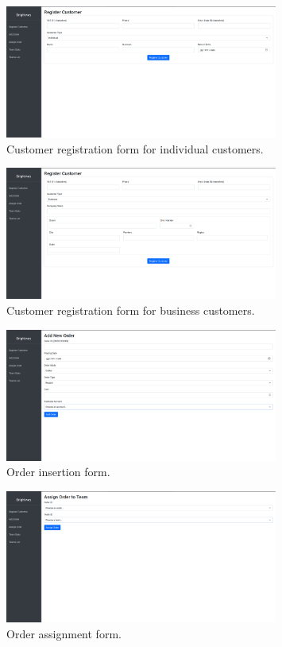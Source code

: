 \begin{figure}[H]
    \centering
    \includegraphics[width=0.8\textwidth]{img/web_app/customer_i.png}
    \caption{Customer registration form for individual customers.}
\end{figure}

\begin{figure}[H]
    \centering
    \includegraphics[width=0.8\textwidth]{img/web_app/customer_b.png}
    \caption{Customer registration form for business customers.}
\end{figure}

\begin{figure}[H]
    \centering
    \includegraphics[width=0.8\textwidth]{img/web_app/add.png}
    \caption{Order insertion form.}
\end{figure}

\begin{figure}[H]
    \centering
    \includegraphics[width=0.8\textwidth]{img/web_app/assign.png}
    \caption{Order assignment form.}
\end{figure}

